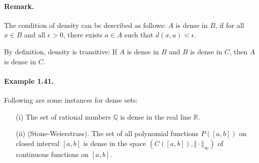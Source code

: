 \documentclass{article}
\begin{document}
\paragraph{Remark.} The condition of density can be described as follows: $A$ is dense in $B$, if for all $x\in B$ and all $\epsilon >0$, there exists $a\in A$ such that $d(x,a) < \epsilon$.

By definition, density is transitive: If $A$ is dense in $B$ and $B$ is dense in $C$, then $A$ is dense in $C$.

\paragraph{Example 1.41.\label{example:1.41}} Following are some instances for dense sets:
\vspace{0.1cm}
\begin{itemize}
	\item[(i)] The set of rational numbers $\mathbb{Q}$ is dense in the real line $\mathbb{R}$.
	\item[(ii)] (Stone-Weierstrass). The set of all polynomial functions $P([a,b])$ on closed interval $[a,b]$ is dense in the space $(C([a,b]),\Vert\cdot\Vert_\infty)$ of continuous functions on $[a,b]$.
\end{itemize}
\end{document}
